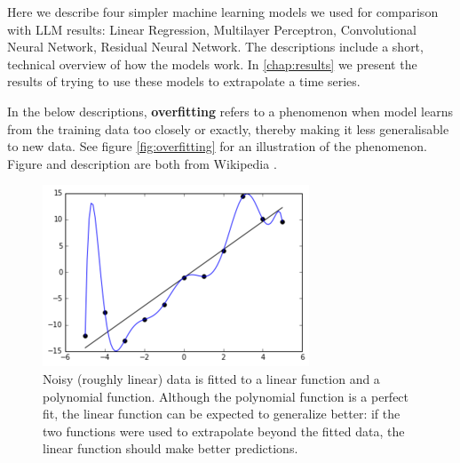 Here we describe four simpler machine learning models we used for comparison with LLM results: Linear Regression, Multilayer Perceptron, Convolutional Neural Network, Residual Neural Network. The descriptions include a short, technical overview of how the models work. In \autoref{chap:results} we present the results of trying to use these models to extrapolate a time series.

In the below descriptions, \textbf{overfitting} refers to a phenomenon when model learns from the training data too closely or exactly, thereby making it less generalisable to new data. See  figure  \autoref{fig:overfitting} for an illustration of the phenomenon. Figure and description are both from Wikipedia \cite{overfitting}.
\begin{figure}[h!]
	\centering
	\includegraphics[width=0.5\linewidth]{"pictures/overfitted_data.png"}
	\caption{Noisy (roughly linear) data is fitted to a linear function and a polynomial function. Although the polynomial function is a perfect fit, the linear function can be expected to generalize better: if the two functions were used to extrapolate beyond the fitted data, the linear function should make better predictions.}
	\label{fig:overfitting}
\end{figure}
